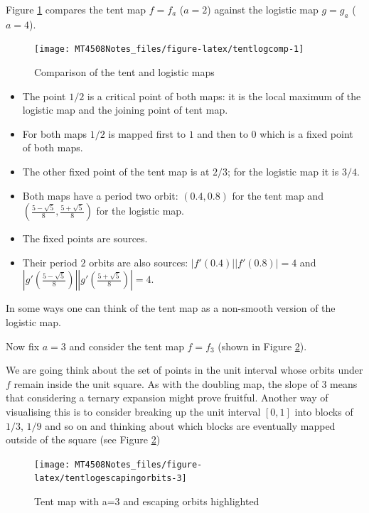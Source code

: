 \documentclass[
  a4paper,
  oneside,
  final]{krantz}
\providecommand{\tightlist}{%
  \setlength{\itemsep}{0pt}\setlength{\parskip}{0pt}}
\theoremstyle{definition}
\theoremstyle{definition}
\theoremstyle{definition}
\theoremstyle{definition}
\theoremstyle{remark}
\begin{document}
Figure \ref{fig:tentlogcomp} compares the tent map \(f = f_{a}\) (\(a=2\)) against the logistic map \(g = g_{a}\) (\(a=4\)).

\begin{figure}

{\centering \texttt{[image: MT4508Notes\_files/figure-latex/tentlogcomp-1]} 

}

\caption{Comparison of the tent and logistic maps}\label{fig:tentlogcomp}
\end{figure}

\begin{itemize}
\tightlist
\item
  The point \(1/2\) is a critical point of both maps: it is the local maximum of the logistic map and the joining point of tent map.
\item
  For both maps \(1/2\) is mapped first to \(1\) and then to \(0\) which is a fixed point of both maps.
\item
  The other fixed point of the tent map is at \(2/3\); for the logistic map it is \(3/4\).
\item
  Both maps have a period two orbit: \((0.4, 0.8)\) for the tent map and \(\left(\frac{5 - \sqrt{5}}{8}, \frac{5 + \sqrt{5}}{8}\right)\) for the logistic map.
\item
  The fixed points are sources.
\item
  Their period \(2\) orbits are also sources:
  \(|f'(0.4)||f'(0.8)| = 4\) and \(\left|g'\left(\frac{5 - \sqrt{5}}{8}\right)\right| \left|g'\left(\frac{5 + \sqrt{5}}{8}\right)\right| = 4\).
\end{itemize}

In some ways one can think of the tent map as a non-smooth version of the logistic map.

Now fix \(a = 3\) and consider the tent map \(f = f_{3}\) (shown in Figure \ref{fig:tentlogescapingorbits}).

We are going think about the set of points in the unit interval whose orbits under \(f\) remain inside the unit square. As with the doubling map, the slope of \(3\) means that considering a ternary expansion might prove fruitful. Another way of visualising this is to consider breaking up the unit interval \([0,1]\) into blocks of \(1/3\), \(1/9\) and so on and thinking about which blocks are eventually mapped outside of the square (see Figure \ref{fig:tentlogescapingorbits})

\begin{figure}

{\centering \texttt{[image: MT4508Notes\_files/figure-latex/tentlogescapingorbits-3]} 

}

\caption{Tent map with a=3 and escaping orbits highlighted}\label{fig:tentlogescapingorbits}
\end{figure}
\end{document}
